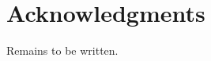 \documentclass[10pt,letterpaper]{article}\usepackage[]{graphicx}\usepackage[]{color}
\begin{document}
\section*{Acknowledgments}
Remains to be written.


\end{document}
